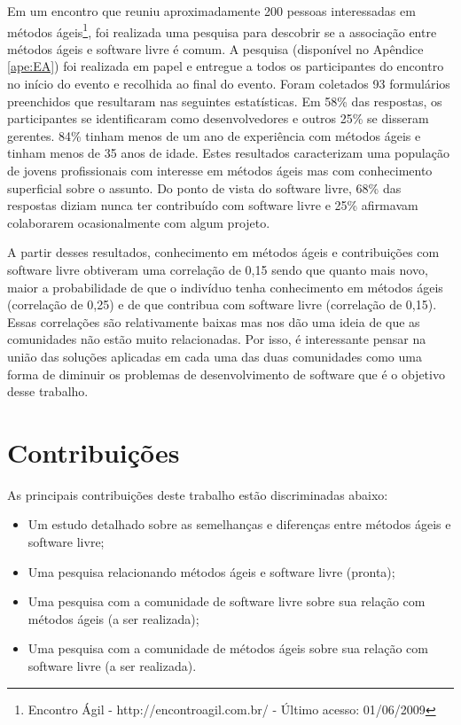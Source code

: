Em um encontro que reuniu aproximadamente 200 pessoas interessadas em
métodos ágeis\footnote{Encontro Ágil - http://encontroagil.com.br/ -
  Último acesso: 01/06/2009}, foi realizada uma pesquisa para
descobrir se a associação entre métodos ágeis e software livre é
comum. A pesquisa (disponível no Apêndice \ref{ape:EA}) foi realizada
em papel e entregue a todos os participantes do encontro no início do
evento e recolhida ao final do evento. Foram coletados 93 formulários
preenchidos que resultaram nas seguintes estatísticas. Em 58\% das
respostas, os participantes se identificaram como desenvolvedores e
outros 25\% se disseram gerentes. 84\% tinham menos de um ano de
experiência com métodos ágeis e tinham menos de 35 anos de
idade. Estes resultados caracterizam uma população de jovens
profissionais com interesse em métodos ágeis mas com conhecimento
superficial sobre o assunto. Do ponto de vista do software livre,
68\% das respostas diziam nunca ter contribuído com software livre e
25\% afirmavam colaborarem ocasionalmente com algum projeto.

A partir desses resultados, conhecimento em métodos ágeis e
contribuições com software livre obtiveram uma correlação de 0,15
sendo que quanto mais novo, maior a probabilidade de que o indivíduo
tenha conhecimento em métodos ágeis (correlação de 0,25) e de que
contribua com software livre (correlação de 0,15). Essas correlações
são relativamente baixas mas nos dão uma ideia de que as comunidades
não estão muito relacionadas. Por isso, é interessante pensar na união
das soluções aplicadas em cada uma das duas comunidades como uma forma
de diminuir os problemas de desenvolvimento de software que é o
objetivo desse trabalho.

\section{Contribuições}
\label{sec:contribucoes}

As principais contribuições deste trabalho estão discriminadas abaixo:

\begin{itemize}
\item Um estudo detalhado sobre as semelhanças e diferenças entre
  métodos ágeis e software livre;
\item Uma pesquisa relacionando métodos ágeis e software livre
  (pronta);
\item Uma pesquisa com a comunidade de software livre sobre sua
  relação com métodos ágeis (a ser realizada);
\item Uma pesquisa com a comunidade de métodos ágeis sobre sua relação
  com software livre (a ser realizada).
\end{itemize}


